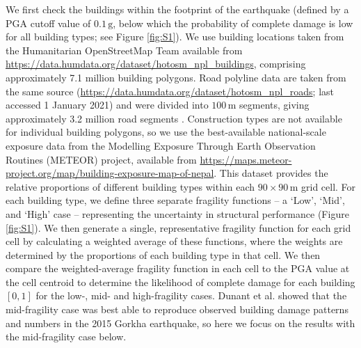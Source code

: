\documentclass[preprint,12pt,authoryear]{elsarticle}
\begin{document}
We first check the buildings within the footprint of the earthquake (defined by a PGA cutoff value of $0.1\,\text{g}$, below which the probability of complete damage is low for all building types; see Figure \ref{fig:S1}). We use building locations taken from the Humanitarian OpenStreetMap Team available from \url{https://data.humdata.org/dataset/hotosm_npl_buildings}, comprising approximately 7.1 million building polygons. Road polyline data are taken from the same source (\url{https://data.humdata.org/dataset/hotosm_npl_roads}; last accessed 1 January 2021) and were divided into $100\,\text{m}$ segments, giving approximately 3.2 million road segments \citep{Dunant2025}. Construction types are not available for individual building polygons, so we use the best-available national-scale exposure data from the Modelling Exposure Through Earth Observation Routines (METEOR) project, available from \url{https://maps.meteor-project.org/map/building-exposure-map-of-nepal}. This dataset provides the relative proportions of different building types within each $90 \times 90\,\text{m}$ grid cell. For each building type, we define three separate fragility functions -- a `Low', `Mid', and `High' case -- representing the uncertainty in structural performance (Figure \ref{fig:S1}). We then generate a single, representative fragility function for each grid cell by calculating a weighted average of these functions, where the weights are determined by the proportions of each building type in that cell. We then compare the weighted-average fragility function in each cell to the PGA value at the cell centroid to determine the likelihood of complete damage for each building $[0,1]$ for the low-, mid- and high-fragility cases. Dunant et al. \citep{Dunant2025} showed that the mid-fragility case was best able to reproduce observed building damage patterns and numbers in the 2015 Gorkha earthquake, so here we focus on the results with the mid-fragility case below.
\end{document}
